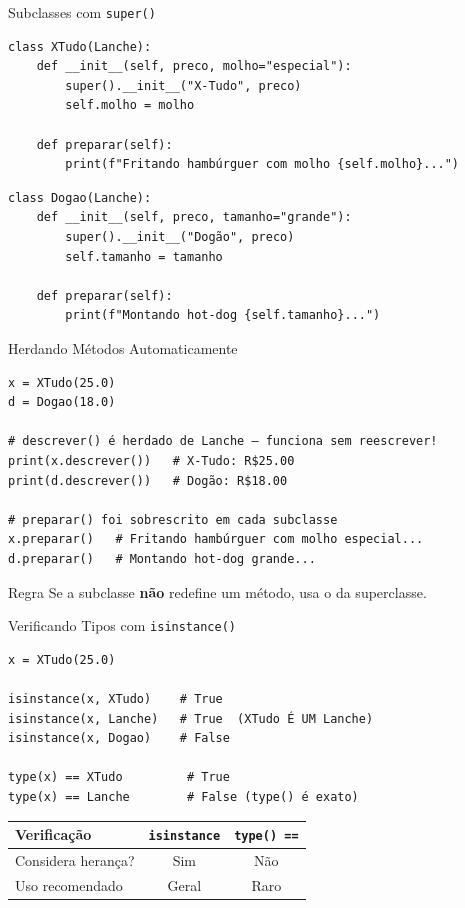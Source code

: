 \documentclass[aspectratio=169]{beamer}
\begin{document}
\begin{frame}[fragile]{Subclasses com \texttt{super()}}
  \begin{lstlisting}
class XTudo(Lanche):
    def __init__(self, preco, molho="especial"):
        super().__init__("X-Tudo", preco)
        self.molho = molho

    def preparar(self):
        print(f"Fritando hambúrguer com molho {self.molho}...")
  \end{lstlisting}

  \begin{lstlisting}
class Dogao(Lanche):
    def __init__(self, preco, tamanho="grande"):
        super().__init__("Dogão", preco)
        self.tamanho = tamanho

    def preparar(self):
        print(f"Montando hot-dog {self.tamanho}...")
  \end{lstlisting}
\end{frame}

\begin{frame}[fragile]{Herdando Métodos Automaticamente}
  \begin{lstlisting}
x = XTudo(25.0)
d = Dogao(18.0)

# descrever() é herdado de Lanche — funciona sem reescrever!
print(x.descrever())   # X-Tudo: R$25.00
print(d.descrever())   # Dogão: R$18.00

# preparar() foi sobrescrito em cada subclasse
x.preparar()   # Fritando hambúrguer com molho especial...
d.preparar()   # Montando hot-dog grande...
  \end{lstlisting}

  \begin{exampleblock}{Regra}
    Se a subclasse \textbf{não} redefine um método, usa o da superclasse.
  \end{exampleblock}
\end{frame}

\begin{frame}[fragile]{Verificando Tipos com \texttt{isinstance()}}
  \begin{lstlisting}
x = XTudo(25.0)

isinstance(x, XTudo)    # True
isinstance(x, Lanche)   # True  (XTudo É UM Lanche)
isinstance(x, Dogao)    # False

type(x) == XTudo         # True
type(x) == Lanche        # False (type() é exato)
  \end{lstlisting}

  \bigskip

  \begin{center}
    \begin{tabular}{lcc}
      \toprule
      \textbf{Verificação} & \textbf{\texttt{isinstance}} & \textbf{\texttt{type() ==}} \\
      \midrule
      Considera herança? & Sim & Não \\
      Uso recomendado    & Geral & Raro \\
      \bottomrule
    \end{tabular}
  \end{center}
\end{frame}
\end{document}
